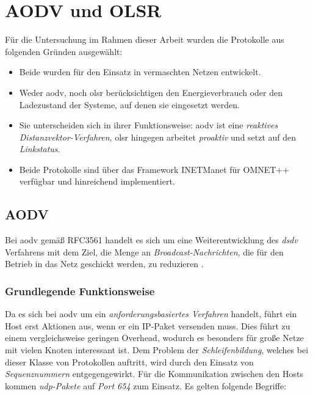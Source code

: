 
\chapter{AODV und OLSR}
\label{chapter:routing}

Für die Untersuchung im Rahmen dieser Arbeit wurden die \og Protokolle aus folgenden Gründen ausgewählt:

\begin{itemize}	
\item Beide wurden für den Einsatz in vermaschten Netzen entwickelt.
\item Weder \gls{aodv}, noch \gls{olsr} berücksichtigen den Energieverbrauch oder den Ladezustand der Systeme, auf denen sie eingesetzt werden.
\item Sie unterscheiden sich in ihrer Funktionsweise: \gls{aodv} ist eine \textit{reaktives} \textit{Distanzvektor-Verfahren}, \gls{olsr} hingegen arbeitet \textit{proaktiv} und setzt auf den \textit{Linkstatus}.
\item Beide Protokolle sind über das Framework INETManet für OMNET++ verfügbar und hinreichend implementiert.
\end{itemize}

\section{AODV}
\label{chapter:routing:aodv}

Bei \acrlong{aodv} gemäß RFC3561 \cite{RFC3561} handelt es sich um eine Weiterentwicklung des \textit{\gls{dsdv}} Verfahrens mit dem Ziel, die Menge an \textit{Broadcast-Nachrichten}, die für den Betrieb in das Netz geschickt werden, zu reduzieren \cite{Azzedine11}. 

\subsection{Grundlegende Funktionsweise}
\label{chapter:routing:aodv:funktion}

Da es sich bei \gls{aodv} um ein \textit{anforderungsbasiertes Verfahren} handelt, führt ein Host erst Aktionen aus, wenn er ein IP-Paket versenden muss. Dies führt zu einem vergleichsweise geringen Overhead, wodurch es besonders für große Netze mit vielen Knoten interessant ist. Dem Problem der \textit{Schleifenbildung}, welches bei dieser Klasse von Protokollen auftritt, wird durch den Einsatz von \textit{Sequenznummern} entgegengewirkt. Für die Kommunikation zwischen den Hosts kommen \textit{\gls{udp}-Pakete} auf \textit{Port 654} zum Einsatz. Es gelten folgende Begriffe:


